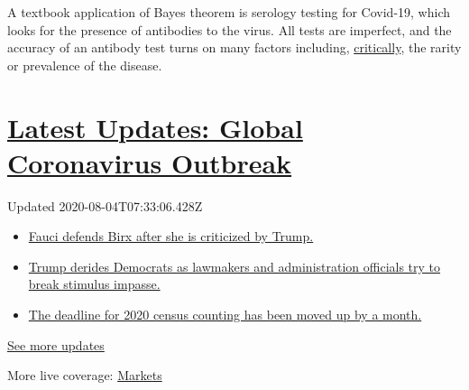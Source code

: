 A textbook application of Bayes theorem is serology testing for
Covid-19, which looks for the presence of antibodies to the virus. All
tests are imperfect, and the accuracy of an antibody test turns on many
factors including,
\href{https://www.scientificamerican.com/article/coronavirus-antibody-tests-have-a-mathematical-pitfall/}{critically},
the rarity or prevalence of the disease.

\hypertarget{latest-updates-global-coronavirus-outbreak}{%
\section{\texorpdfstring{\href{https://www.nytimes3xbfgragh.onion/2020/08/03/world/coronavirus-covid-19.html?action=click\&pgtype=Article\&state=default\&region=MAIN_CONTENT_1\&context=storylines_live_updates}{Latest
Updates: Global Coronavirus
Outbreak}}{Latest Updates: Global Coronavirus Outbreak}}\label{latest-updates-global-coronavirus-outbreak}}

Updated 2020-08-04T07:33:06.428Z

\begin{itemize}
\tightlist
\item
  \href{https://www.nytimes3xbfgragh.onion/2020/08/03/world/coronavirus-covid-19.html?action=click\&pgtype=Article\&state=default\&region=MAIN_CONTENT_1\&context=storylines_live_updates\#link-4547638f}{Fauci
  defends Birx after she is criticized by Trump.}
\item
  \href{https://www.nytimes3xbfgragh.onion/2020/08/03/world/coronavirus-covid-19.html?action=click\&pgtype=Article\&state=default\&region=MAIN_CONTENT_1\&context=storylines_live_updates\#link-15e7f995}{Trump
  derides Democrats as lawmakers and administration officials try to
  break stimulus impasse.}
\item
  \href{https://www.nytimes3xbfgragh.onion/2020/08/03/world/coronavirus-covid-19.html?action=click\&pgtype=Article\&state=default\&region=MAIN_CONTENT_1\&context=storylines_live_updates\#link-e5a2cda}{The
  deadline for 2020 census counting has been moved up by a month.}
\end{itemize}

\href{https://www.nytimes3xbfgragh.onion/2020/08/03/world/coronavirus-covid-19.html?action=click\&pgtype=Article\&state=default\&region=MAIN_CONTENT_1\&context=storylines_live_updates}{See
more updates}

More live coverage:
\href{https://www.nytimes3xbfgragh.onion/live/2020/08/03/business/stock-market-today-coronavirus?action=click\&pgtype=Article\&state=default\&region=MAIN_CONTENT_1\&context=storylines_live_updates}{Markets}

